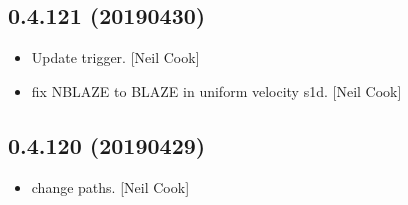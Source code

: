 \documentclass[a4paper,10pt,english]{report}
\begin{document}
\subsection{0.4.121 (2019\sphinxhyphen{}04\sphinxhyphen{}30)}
\label{\detokenize{misc/changelog:id159}}\begin{itemize}
\item {} 
Update trigger. {[}Neil Cook{]}

\item {} 
 \sphinxhyphen{} fix NBLAZE to BLAZE in uniform velocity s1d. {[}Neil
Cook{]}

\end{itemize}


\subsection{0.4.120 (2019\sphinxhyphen{}04\sphinxhyphen{}29)}
\label{\detokenize{misc/changelog:id160}}\begin{itemize}
\item {} 
 \sphinxhyphen{} change paths. {[}Neil Cook{]}

\end{itemize}
\end{document}
